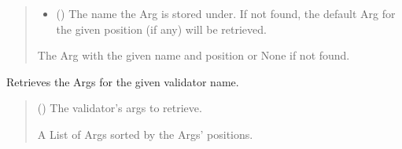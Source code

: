 \documentclass[letterpaper,10pt,english]{sphinxmanual}
\begin{document}
\begin{fulllineitems}
\begin{fulllineitems}
\begin{quote}
\begin{description}
\begin{itemize}
\item {} 
\sphinxAtStartPar
{} (\sphinxstyleliteralemphasis{\sphinxupquote{ | }}) \textendash{} The name the Arg is stored under. If not found, the default Arg for the given position (if any) will be retrieved.

\end{itemize}

\sphinxAtStartPar
The Arg with the given name and position or None if not found.

\end{description}\end{quote}

\end{fulllineitems}


\begin{fulllineitems}
\label{\detokenize{apache_commons_validator_python:apache_commons_validator_python.field_new.Field.get_args}}
\pysigstartsignatures
{}
\pysigstopsignatures
\sphinxAtStartPar
Retrieves the Args for the given validator name.
\begin{quote}\begin{description}
\sphinxAtStartPar
{} () \textendash{} The validator’s args to retrieve.

\sphinxAtStartPar
A List of Args sorted by the Args’ positions.

\end{description}\end{quote}

\end{fulllineitems}



\end{fulllineitems}
\end{document}
